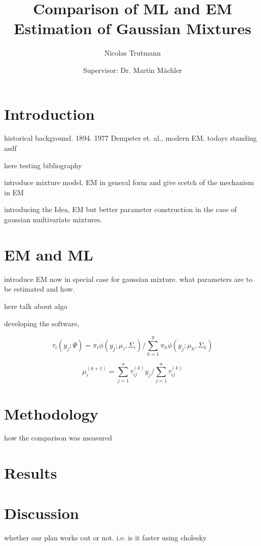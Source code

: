 


\title{Comparison of ML and EM Estimation of Gaussian Mixtures}
\author{Nicolas Trutmann \and Supervisor: Dr. Martin Mächler}




\maketitle

\tableofcontents

\section{Introduction}

historical background. 1894. 1977 Dempster et. al., modern EM. todays standing
asdf 

here testing bibliography \cite{McLGP00} \cite{McL17}

introduce mixture model, EM in general form and give scetch of the mechanism in EM

introducing the Idea, EM but better parameter construction in the case of gaussian multivariate mixtures.

\section{EM and ML}

introduce EM now in special case for gaussian mixture. what parameters are to be estimated and how.

here talk about algo

developing the software,


\[ \tau_{i}(y_j; \Psi) = \pi_i \phi(y_j; \mu_i, \Sigma_i) / \sum_{h=1}^g \pi_h \phi(y_j;\mu_h, \Sigma_h) \]

\[ \mu_i^{(k+1)} = \sum_{j=1}^n \tau_{ij}^{(k)} y_j /\sum_{j=1}^n \tau_{ij}^{(k)} \]

\section{Methodology}

how the comparison was measured

\section{Results}

\section{Discussion}

whether our plan works out or not. i.e. is it faster using cholesky






